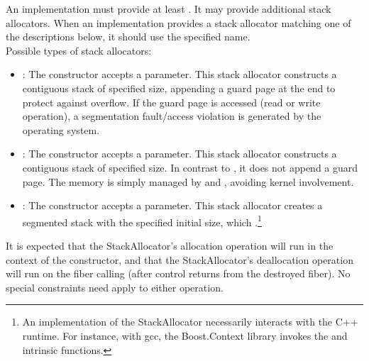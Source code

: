 An implementation must provide at least . It may provide
additional stack allocators. When an implementation provides a stack allocator
matching one of the descriptions below, it should use the specified name.\\

Possible types of stack allocators:
\begin{itemize}
    \item {}: The constructor accepts a 
          parameter. This stack allocator constructs a contiguous stack of
          specified size, appending a guard page at the end to protect against
          overflow. If the guard page is accessed (read or write operation), a
          segmentation fault/access violation is generated by the operating
          system.
    \item {}: The constructor accepts a  parameter.
          This stack allocator constructs a contiguous stack of specified size.
          In contrast to , it does not append a guard
          page. The memory is simply managed by 
          and , avoiding kernel involvement.
    \item {}: The constructor accepts a  parameter.
          This stack allocator creates a segmented stack\cite{gccsplit} with the
          specified initial size, which .\footnote{An
          implementation of the  StackAllocator necessarily
          interacts with the C++ runtime. For instance, with gcc, the
          Boost.Context\cite{bcontext} library invokes
          the 
          and  intrinsic
          functions.\cite{splitalloc}}
\end{itemize}

It is expected that the StackAllocator's allocation operation will run in the
context of the \fiber constructor, and that the StackAllocator's deallocation
operation will run on the fiber calling \dtor (after control returns from the
destroyed fiber). No special constraints need apply to either operation.
